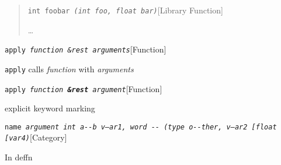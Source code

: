 \documentclass{book}
\begin{document}
\begin{quote}
\noindent\texttt{int foobar \bgroup{}\normalfont{}\textsl{(int \textsl{foo}, float \textsl{bar})}\egroup{}}\hfill[Library Function]



%
\dots{}\@
\end{quote}

\noindent\texttt{apply \bgroup{}\normalfont{}\textsl{function \&rest arguments}\egroup{}}\hfill[Function]



%
\texttt{apply} calls \textsl{function} with \textsl{arguments}

\noindent\texttt{apply \bgroup{}\normalfont{}\textsl{function \textrm{\textbf{\&rest}} argument}\egroup{}}\hfill[Function]



%
explicit keyword marking

\noindent\texttt{name \bgroup{}\normalfont{}\textsl{argument \texttt{int} \texttt{a{-}{-}b} \textsl{v--ar1}, word \texttt{{-}{-}} (\texttt{type o{-}{-}ther}, \textsl{v---ar2}  {[}\texttt{float} {[}\textsl{var4})}\egroup{}}\hfill[Category]



%
In deffn
\end{document}
